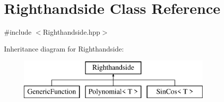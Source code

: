 \hypertarget{class_righthandside}{}\section{Righthandside Class Reference}
\label{class_righthandside}


{\ttfamily \#include $<$Righthandside.\+hpp$>$}

Inheritance diagram for Righthandside\+:\begin{figure}[H]
\begin{center}
\leavevmode
\includegraphics[height=2.000000cm]{class_righthandside}
\end{center}
\end{figure}
